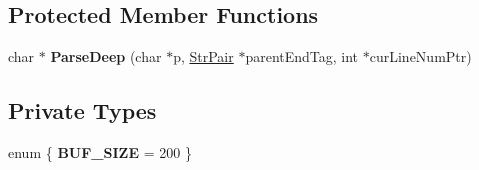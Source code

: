 \subsection*{Protected Member Functions}
\begin{DoxyCompactItemize}
\item 
\mbox{\label{classtinyxml2_1_1XMLElement_a84c63832a2e7dd9ed6168fe808e88801}} 
char $\ast$ {\bfseries Parse\+Deep} (char $\ast$p, \mbox{\hyperlink{classtinyxml2_1_1StrPair}{Str\+Pair}} $\ast$parent\+End\+Tag, int $\ast$cur\+Line\+Num\+Ptr)
\end{DoxyCompactItemize}
\subsection*{Private Types}
\begin{DoxyCompactItemize}
\item 
\mbox{\label{classtinyxml2_1_1XMLElement_a07a6ce25c17aaa505933db57f2373e50}} 
enum \{ {\bfseries B\+U\+F\+\_\+\+S\+I\+ZE} = 200
 \}
\end{DoxyCompactItemize}
